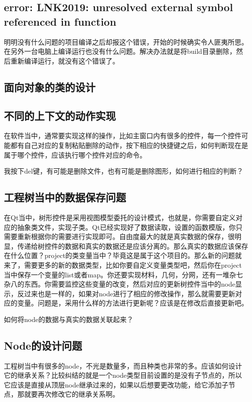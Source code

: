 \subsection{error: LNK2019: unresolved external symbol referenced in function}

明明没有什么问题的项目编译之后却报这个错误，开始的时候确实令人匪夷所思。在另外一台电脑上编译运行也没有什么问题。解决办法就是将build目录删除，然后重新编译运行，就没有这个错误了。

\subsection{面向对象的类的设计}

\subsection{不同的上下文的动作实现}
在软件当中，通常要实现这样的操作，比如主窗口内有很多的控件，每一个控件可能都有自己对应的复制粘贴删除的动作，按下相应的快捷键之后，如何判断现在是属于哪个控件，应该执行哪个控件对应的命令。

我按下del键，有可能是删除文件，也有可能是删除图形，如何进行相应的判断？

\subsection{工程树当中的数据保存问题}
在Qt当中，树形控件是采用视图模型委托的设计模式，也就是，你需要自定义对应的抽象类文件，实现子类。Qt已经实现好了数据读取，设置的函数模版，你只需要重新根据你的需要进行实现即可。自由度最大的就是真实数据的保存，很明显，传递给树控件的数据和真实的数据还是应该分离的。那么真实的数据应该保存在什么位置？project的类变量当中？毕竟这是属于这个项目的。那么新的问题就来了，需要更多的新的数据类型，比如你要自定义变量类型吧，然后你在project当中保存一个变量的list或者map。你还要实现材料，几何，分网，还有一堆杂七杂八的东西。你需要监控这些变量的改变，然后对应的更新树控件当中的node显示，反过来也是一样的，如果对node进行了相应的修改操作，那么就需要更新对应的变量。问题是，采用什么样的方法进行更新呢？应该是在修改后直接更新吧。

如何将node的数据与真实的数据关联起来？
\subsection{Node的设计问题}
工程树当中有很多的node，不光是数量多，而且种类也非常的多。应该如何设计它的继承关系？比较纠结的就是一个node类型目前设置的是没有子节点的，所以它应该是直接从顶层node继承过来的，如果以后想要更改功能，给它添加子节点，那就要再次修改它的继承关系啊。
